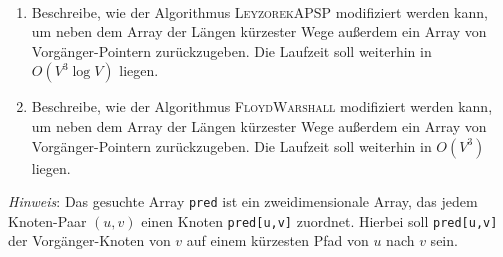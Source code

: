 \documentclass{uebung_cs}
\begin{document}
\begin{aufgabe}
\ 
  \begin{enumerate}
    \item Beschreibe, wie der Algorithmus \textsc{LeyzorekAPSP} modifiziert werden kann, um neben dem Array der Längen kürzester Wege außerdem ein Array von Vorgänger-Pointern zurückzugeben.
    Die Laufzeit soll weiterhin in $O(V^3 \log V)$ liegen.
    \item Beschreibe, wie der Algorithmus \textsc{FloydWarshall} modifiziert werden kann, um neben dem Array der Längen kürzester Wege außerdem ein Array von Vorgänger-Pointern zurückzugeben.
    Die Laufzeit soll weiterhin in $O(V^3)$ liegen.
  \end{enumerate}
  \emph{Hinweis}: Das gesuchte Array \texttt{pred} ist ein zweidimensionale Array, das jedem Knoten-Paar $(u,v)$ einen Knoten \texttt{pred[u,v]} zuordnet. Hierbei soll \texttt{pred[u,v]} der Vorgänger-Knoten von $v$ auf einem kürzesten Pfad von $u$ nach $v$ sein.
\end{aufgabe}

\end{document}
